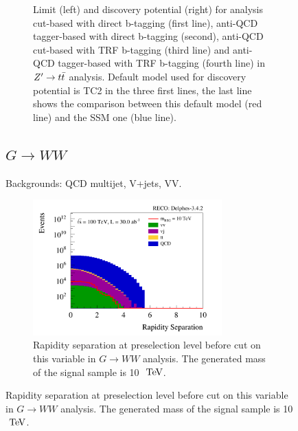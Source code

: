 \documentclass{cernrep}
\begin{document}
\begin{figure}[!htb]
\begin{figure}[!htb]
\caption{Limit (left) and discovery potential (right) for analysis cut-based with direct b-tagging (first line), anti-QCD tagger-based with direct b-tagging (second), anti-QCD cut-based with TRF b-tagging (third line) and anti-QCD tagger-based with TRF b-tagging (fourth line) in $Z^{\prime} \rightarrow t\bar{t}$ analysis. Default model used for discovery potential is TC2 in the three first lines, the last line shows the comparison between this default model (red line) and the SSM one (blue line).}
\label{fig:Zptt_limit}
\end{figure}


\subsection{$G \rightarrow WW$}
\label{subsec:RSGww}

Backgrounds: QCD multijet, V+jets, VV.

\begin{figure}[!htb]\centering
\includegraphics[width=0.8\textwidth]{Fig/RSGww/rapiditySeparation_sel0_nostack_log.png}
\caption{Rapidity separation at preselection level before cut on this variable in $G \rightarrow WW$ analysis. The generated mass of the signal sample is 10 $\TeV$.}
\label{fig:RSGww_sel0_rapidity}
\end{figure}


\end{figure}
\end{document}

